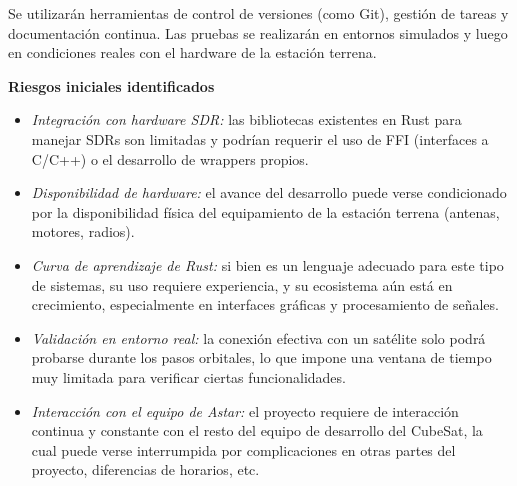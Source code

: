 Se utilizarán herramientas de control de versiones (como Git), gestión de tareas y documentación continua. Las pruebas se realizarán en entornos simulados y luego en condiciones reales con el hardware de la estación terrena.

\textbf{Riesgos iniciales identificados}
\begin{itemize}
    \item \textit{Integración con hardware SDR:} las bibliotecas existentes en Rust para manejar SDRs son limitadas y podrían requerir el uso de FFI (interfaces a C/C++) o el desarrollo de wrappers propios.
    
    \item \textit{Disponibilidad de hardware:} el avance del desarrollo puede verse condicionado por la disponibilidad física del equipamiento de la estación terrena (antenas, motores, radios).
    
    \item \textit{Curva de aprendizaje de Rust:} si bien es un lenguaje adecuado para este tipo de sistemas, su uso requiere experiencia, y su ecosistema aún está en crecimiento, especialmente en interfaces gráficas y procesamiento de señales.
    
    \item \textit{Validación en entorno real:} la conexión efectiva con un satélite solo podrá probarse durante los pasos orbitales, lo que impone una ventana de tiempo muy limitada para verificar ciertas funcionalidades.

    \item \textit{Interacción con el equipo de Astar:} el proyecto requiere de interacción continua y constante con el resto del equipo de desarrollo del CubeSat, la cual puede verse interrumpida por complicaciones en otras partes del proyecto, diferencias de horarios, etc.
\end{itemize}